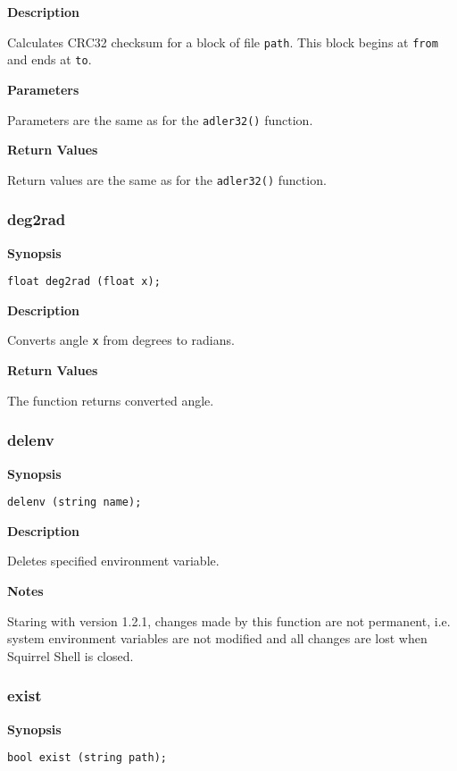 \documentclass[a4paper, 10pt, titlepage]{article}
\begin{document}
\textbf{Description}

Calculates CRC32 checksum for a block of file \texttt{path}. This block begins at \texttt{from} and ends at \texttt{to}.

\textbf{Parameters}

Parameters are the same as for the \texttt{adler32()} function.

\textbf{Return Values}

Return values are the same as for the \texttt{adler32()} function.

\subsubsection{deg2rad}

\textbf{Synopsis}

\begin{verbatim}
float deg2rad (float x);
\end{verbatim}

\textbf{Description}

Converts angle \texttt{x} from degrees to radians.

\textbf{Return Values}

The function returns converted angle.

\subsubsection{delenv}

\textbf{Synopsis}

\begin{verbatim}
delenv (string name);
\end{verbatim}

\textbf{Description}

Deletes specified environment variable.

\textbf{Notes}

Staring with version 1.2.1, changes made by this function are not permanent, i.e. system environment variables are not modified and all changes are lost when Squirrel Shell is closed.

\subsubsection{exist}

\textbf{Synopsis}

\begin{verbatim}
bool exist (string path);
\end{verbatim}
\end{document}
